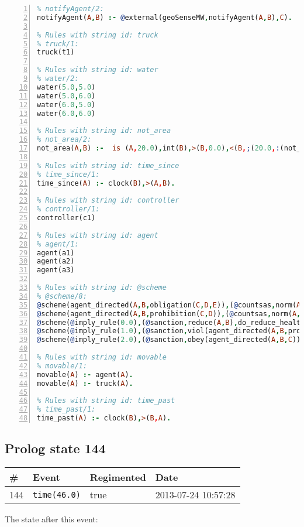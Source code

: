 \documentclass[11pt]{article}\usepackage[utf8]{inputenc}\usepackage{geometry}
\begin{document}
\begin{lstlisting}[language=Prolog, numbers=left]
% Rules with string id: notifyAgent
% notifyAgent/2:
notifyAgent(A,B) :- @external(geoSenseMW,notifyAgent(A,B),C).

% Rules with string id: truck
% truck/1:
truck(t1)

% Rules with string id: water
% water/2:
water(5.0,5.0)
water(5.0,6.0)
water(6.0,5.0)
water(6.0,6.0)

% Rules with string id: not_area
% not_area/2:
not_area(A,B) :-  is (A,20.0),int(B),>(B,0.0),<(B,;(20.0,:(not_area(A,B), is (-(B),20.0)))),int(A),>(A,0.0),<(A,;(20.0,:(area(A,B),-(int(A))))),int(B),>(A,0.0),>(B,0.0),<(A,21.0),<(B,21.0).

% Rules with string id: time_since
% time_since/1:
time_since(A) :- clock(B),>(A,B).

% Rules with string id: controller
% controller/1:
controller(c1)

% Rules with string id: agent
% agent/1:
agent(a1)
agent(a2)
agent(a3)

% Rules with string id: @scheme
% @scheme/8:
@scheme(agent_directed(A,B,obligation(C,D,E)),(@countsas,norm(A,B,F,obligation(C,D,E)),F),false,(listTrue(C)),(time_past(D)),false,[plus(viol(agent_directed(A,B,obligation(C,D,E))))|[]],[plus(obey(agent_directed(A,B,obligation(C,D,E))))|[]])
@scheme(agent_directed(A,B,prohibition(C,D)),(@countsas,norm(A,B,E,prohibition(C,D)),E),(listTrue(C)),false,(false),false,[plus(viol(agent_directed(A,B,prohibition(C,D))))|[]],[plus(obey(agent_directed(A,B,prohibition(C,D))))|[]])
@scheme(@imply_rule(0.0),(@sanction,reduce(A,B),do_reduce_health(A,B),notifyAgent(A,changed(status))),true,false,false,false,[min(reduce(A,B))|[]],[])
@scheme(@imply_rule(1.0),(@sanction,viol(agent_directed(A,B,prohibition(C,D))),do_sanction(D)),true,false,false,false,[min(viol(agent_directed(A,B,prohibition(C,D))))|[]],[])
@scheme(@imply_rule(2.0),(@sanction,obey(agent_directed(A,B,C))),true,false,false,false,[min(obey(agent_directed(A,B,C)))|[]],[])

% Rules with string id: movable
% movable/1:
movable(A) :- agent(A).
movable(A) :- truck(A).

% Rules with string id: time_past
% time_past/1:
time_past(A) :- clock(B),>(B,A).

\end{lstlisting}
\clearpage 
\subsection{Prolog state 144}
\begin{table}[ht]
\centering 
\begin{tabular}{l l l l} 
\textbf{\#} & \textbf{Event} & \textbf{Regimented} & \textbf{Date} \\ [0.5ex] 
\hline
144&\texttt{time(46.0)}&true&2013-07-24 10:57:28\\ [1ex] \hline\end{tabular}
\end{table}
The state after this event:
\end{document}
